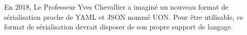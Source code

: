 En 2018, Le Professeur Yves Chevallier a imaginé un nouveau format de sérialisation proche de YAML et JSON nommé UON.
Pour être utilisable, ce format de sérialisation devrait disposer de son propre support de langage.
